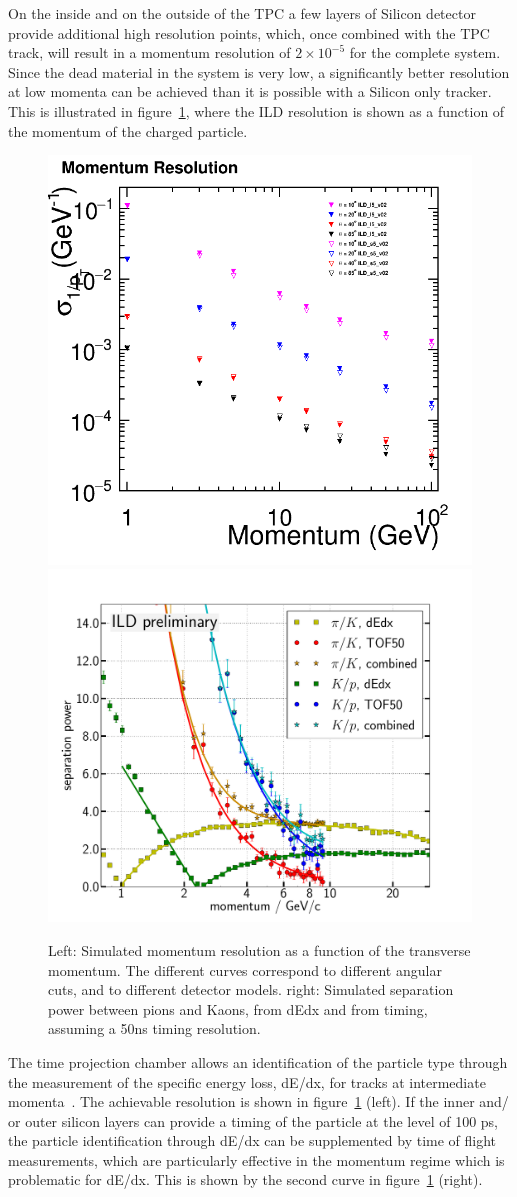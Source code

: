 \documentclass[%
 amsmath,amssymb,
 aps,
]{revtex4-1}
\begin{document}
On the inside and on the outside of the TPC a few layers of Silicon detector provide additional high resolution points, which, once combined with the TPC track, will result in a momentum resolution of $2 \times 10^{-5}$ for the complete system. Since the dead material in the system is very low, a significantly better resolution at low momenta can be achieved than it is possible with a Silicon only tracker. This is illustrated in figure~\ref{fig:momentumvsp}, where the ILD resolution is shown as a function of the momentum of the charged particle. 

\begin{figure}
    \centering
    \includegraphics[width=0.38\hsize]{figures/PResolution_ILD_ls5_v02.png}
        \includegraphics[width=0.55\hsize]{figures/Combined_dEdx_TOF50.pdf}
    \caption{ Left: Simulated momentum resolution as a function of the transverse momentum. The different curves correspond to different angular cuts, and to different detector models. right: Simulated separation power between pions and Kaons, from dEdx and from timing, assuming a 50ns timing resolution.}
    \label{fig:momentumvsp}
\end{figure}

The time projection chamber allows an identification of the particle type through the measurement of the specific energy loss, dE/dx, for tracks at intermediate momenta~\cite{Hauschild:2000eg}. The achievable resolution is shown in figure~\ref{fig:momentumvsp} (left). If the inner and/ or outer silicon layers can provide a timing of the particle at the level of 100 ps, the particle identification through dE/dx can be supplemented by time of flight measurements, which are particularly effective in the momentum regime which is problematic for dE/dx. This is shown by the second curve in figure~\ref{fig:momentumvsp} (right). 
\end{document}
